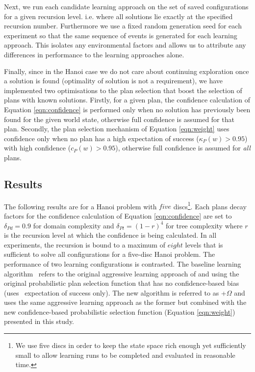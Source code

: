 Next, we run each candidate learning approach on the set of saved configurations for a given recursion level. i.e. where all solutions lie exactly at the specified recursion number. Furthermore we use a fixed random generation seed for each experiment so that the same sequence of  events is generated for each learning approach. This isolates any environmental factors and allows us to attribute any differences in performance to the learning approaches alone.

Finally, since in the Hanoi case we do not care about continuing exploration once a solution is found (optimality of solution is not a requirement), we have implemented two optimisations to the plan selection that boost the selection of plans with known solutions. Firstly, for a given plan, the confidence calculation of Equation \ref{eqn:confidence} is performed only when no solution has previously been found for the given world state, otherwise full confidence is assumed for that plan. Secondly, the plan selection mechanism of Equation \ref{eqn:weight} uses confidence only when no plan has a high expectation of success ($\kappa_P(w) > 0.95$) with high confidence ($c_P(w) > 0.95$), otherwise full confidence is assumed for \textit{all} plans. 

\subsection{Results}

The following results are for a Hanoi problem with $five$ discs\footnote{We use five discs in order to keep the state space rich enough yet sufficiently small to allow learning runs to be completed and evaluated in reasonable time.}. Each plans decay factors for the confidence calculation of Equation \ref{eqn:confidence} are set to $\delta_{Pd} = 0.9$ for domain complexity and $\delta_{Pt} = (1-r)^4$ for tree complexity where $r$ is the recursion level at which the confidence is being calculated. In all experiments, the recursion is bound to a maximum of $eight$ levels that is sufficient to solve all configurations for a five-disc Hanoi problem. The performance of two learning configurations is contrasted. The baseline learning algorithm \CL\ refers to the original aggressive learning approach of \cite{Airiau:IJAT:09} and \cite{Singh:AAMAS10} using the original probabilistic plan selection function that has no confidence-based bias (uses \dt\ expectation of success only). The new algorithm is referred to as \CL+$\Omega$ and uses the same aggressive learning approach as the former but combined with the new confidence-based probabilistic selection function (Equation \ref{eqn:weight}) presented in this study.

